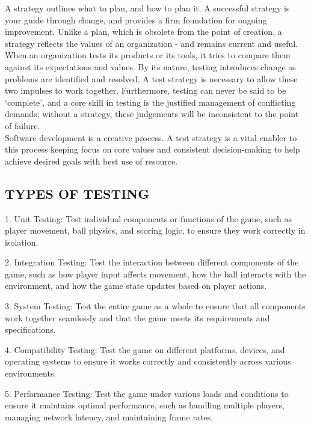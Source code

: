 \documentclass[12pt]{report}
\begin{document}
A strategy outlines what to plan, and how to plan it. A successful strategy is your guide 
through change, and provides a firm foundation for ongoing improvement. Unlike a plan, 
which is obsolete from the point of creation, a strategy reflects the values of an organization 
- and remains current and useful. When an organization tests its products or its tools, it tries 
to compare them against its expectations and values. By its nature, testing introduces change 
as problems are identified and resolved. A test strategy is necessary to allow these two 
impulses to work together. Furthermore, testing can never be said to be ‘complete’, and a 
core skill in testing is the justified management of conflicting demands; without a strategy, 
these judgements will be inconsistent to the point of failure.\\
Software development is a creative process. A test strategy is a vital enabler to this process 
keeping focus on core values and consistent decision-making to help achieve desired goals 
with best use of resource. 

\subsection{TYPES OF TESTING}
\justifying
\setlength{\parindent}{4em}
\setlength{\parskip}{0.5em}
\renewcommand{\baselinestretch}{1.5}
\normalsize

\hspace{1.7 cm} 
1. Unit Testing:
Test individual components or functions of the game, such as player movement, ball physics, and scoring logic, to ensure they work correctly in isolation.

2. Integration Testing:
Test the interaction between different components of the game, such as how player input affects movement, how the ball interacts with the environment, and how the game state updates based on player actions.

3. System Testing:
Test the entire game as a whole to ensure that all components work together seamlessly and that the game meets its requirements and specifications.

4. Compatibility Testing:
Test the game on different platforms, devices, and operating systems to ensure it works correctly and consistently across various environments.

5. Performance Testing:
Test the game under various loads and conditions to ensure it maintains optimal performance, such as handling multiple players, managing network latency, and maintaining frame rates.
\end{document}
